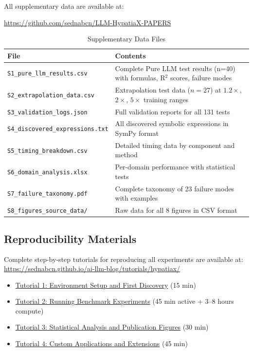 \documentclass[twoside,11pt]{article}
\begin{document}
All supplementary data are available at:
\begin{center}
{\small\url{https://github.com/sednabcn/LLM-HypatiaX-PAPERS}}
\end{center}

\begin{table}[H]
\centering
\caption{Supplementary Data Files}
\label{tab:supplementary_files}
\small
\begin{tabular}{@{}lp{8cm}@{}}
\toprule
\textbf{File} & \textbf{Contents} \\
\midrule
\texttt{S1\_pure\_llm\_results.csv} & Complete Pure LLM test results (n=40) with formulas, R$^{2}$ scores, failure modes \\
\texttt{S2\_extrapolation\_data.csv} & Extrapolation test data ($n=27$) at $1.2\times$, $2\times$, $5\times$ training ranges \\
\texttt{S3\_validation\_logs.json} & Full validation reports for all 131 tests \\
\texttt{S4\_discovered\_expressions.txt} & All discovered symbolic expressions in SymPy format \\
\texttt{S5\_timing\_breakdown.csv} & Detailed timing data by component and method \\
\texttt{S6\_domain\_analysis.xlsx} & Per-domain performance with statistical tests \\
\texttt{S7\_failure\_taxonomy.pdf} & Complete taxonomy of 23 failure modes with examples \\
\texttt{S8\_figures\_source\_data/} & Raw data for all 8 figures in CSV format \\
\bottomrule
\end{tabular}
\end{table}

\subsection{Reproducibility Materials}

Complete step-by-step tutorials for reproducing all experiments are available at:
\url{https://sednabcn.github.io/ai-llm-blog/tutorials/hypatiax/}

\begin{itemize}
\item \href{https://sednabcn.github.io/ai-llm-blog/tutorials/hypatiax/setup/}{Tutorial 1: Environment Setup and First Discovery} (15 min)
\item \href{https://sednabcn.github.io/ai-llm-blog/tutorials/hypatiax/experiments/}{Tutorial 2: Running Benchmark Experiments} (45 min active + 3--8 hours compute)
\item \href{https://sednabcn.github.io/ai-llm-blog/tutorials/hypatiax/analysis/}{Tutorial 3: Statistical Analysis and Publication Figures} (30 min)
\item \href{https://sednabcn.github.io/ai-llm-blog/tutorials/hypatiax/extensions/}{Tutorial 4: Custom Applications and Extensions} (45 min)
\end{itemize}
\end{document}
